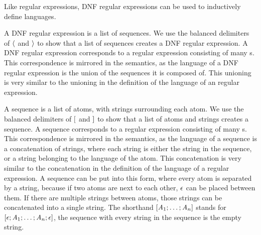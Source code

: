 \documentclass[numbers,10pt,preprint\ifanon ,nocopyrightspace\fi]{sigplanconf}
\begin{document}
Like regular expressions, DNF regular expressions can be used to inductively
define languages.\\

A DNF regular expression is a list of sequences.
We use the balanced delimiters of $\langle$ and $\rangle$
to show that a list of sequences creates a DNF regular expression.
A DNF regular expression corresponds to a regular expression consisting of many
\OrRegexType{}s.  
This correspondence is mirrored in the semantics, as the language of a DNF
regular expression
is the union of the sequences it is composed of.  This unioning is very similar
to the unioning in the definition of the
language of an
\OrRegexType{} regular expression.

A sequence is a list of atoms, with strings surrounding each atom.
We use the balanced delimiters of $[$ and $]$ to show
that a list of atoms and strings creates a sequence.
A sequence corresponds to a regular expression consisting
of many \ConcatRegexType{}s.
This correspondence is mirrored in the semantics, as the language of a sequence is a
concatenation of strings, where each string is either the string in the
sequence, or a string belonging to the language of the atom.  This concatenation
is very
similar to the concatenation in the definition of the language of
a \ConcatRegexType{} regular expression.
A sequence can be put into this form, where every atom is separated by a string,
because if two atoms are next to each other, $\epsilon$ can be placed
between them.  If there are multiple strings between atoms, those strings can be
concatenated into a single string.
The shorthand $[\mathit{A}_1;\ldots;\mathit{A}_n]$
stands for
$[\epsilon;\mathit{A}_1;\ldots;\mathit{A}_n;\epsilon]$, the sequence
with every string in the sequence is the empty string.
\end{document}
